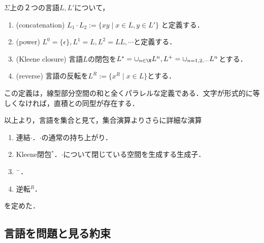 \begin{definition}\label{def-operation-of-languages-Kleene}
    $\Sigma$上の２つの言語$L,L'$について，
    \begin{enumerate}
        \item (concatenation) $L_1\cdot L_2:=\{xy\mid x\in L,y\in L'\}$
        と定義する．
        \item (power) $L^0=\{\epsilon\}, L^1=L,L^2=LL,\cdots$と定義する．
        \item (Kleene closure) 言語$L$の閉包を$L^*=\cup_{n\in\N}L^n, L^+=\cup_{n=1,2,\cdots}L^n$とする．
        \item (reverse) 言語の反転を$L^R:=\{x^R\mid x\in L\}$とする．
    \end{enumerate}
\end{definition}
\begin{remark}
    この定義は，線型部分空間の和と全くパラレルな定義である．文字が形式的に等しくなければ，直積との同型が存在する．
\end{remark}

\begin{screen}
    以上より，言語を集合と見て，集合演算よりさらに詳細な演算
    \begin{enumerate}
        \item 連結$\cdot$．$\cdot$の通常の持ち上がり．
        \item Kleene閉包${}^*$．$\cdot$について閉じている空間を生成する生成子．
        \item ${}^-$．
        \item 逆転${}^R$．
    \end{enumerate}
    を定めた．
\end{screen}

\subsection{言語を問題と見る約束}


